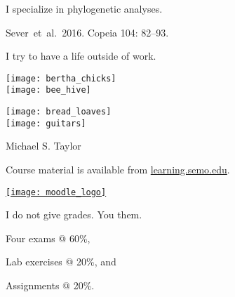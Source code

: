 \documentclass[t]{beamer}
\begin{document}
%		
{
	\begin{frame}[t]{I specialize in phylogenetic analyses.}
		
		\vfilll
		
		\hfill \tiny Sever~et~al.~2016. Copeia 104: 82–93.
	\end{frame}
}
%
%		
%		
%		
%
%
\begin{frame}[t]{I try to have a life outside of work.}

	\vspace*{-\baselineskip}
	
	\begin{multicols}{2}
		\texttt{[image: bertha\_chicks]} \\[1ex]
		\texttt{[image: bee\_hive]} \\
		
	\columnbreak
		
		\texttt{[image: bread\_loaves]} \\[1ex]
		\texttt{[image: guitars]} \\
		
	\end{multicols}
		
		\vfilll

	\hfill \tiny Michael S. Taylor 

\end{frame}
%
\begin{frame}[t]{Course material is available from \href{http://learning.semo.edu}{learning.semo.edu}.}
	\begin{center}
		
		\href{http://learning.semo.edu}{\texttt{[image: moodle\_logo]}}
		
		\medskip
		
	\end{center}
	
\end{frame}
%
\begin{frame}[t]{I do not give grades. You  them.}

	\hangpara Four exams @ 60\%,

	\hangpara Lab exercises @ 20\%, and

	\hangpara Assignments @ 20\%.

\end{frame}
%
\end{document}
